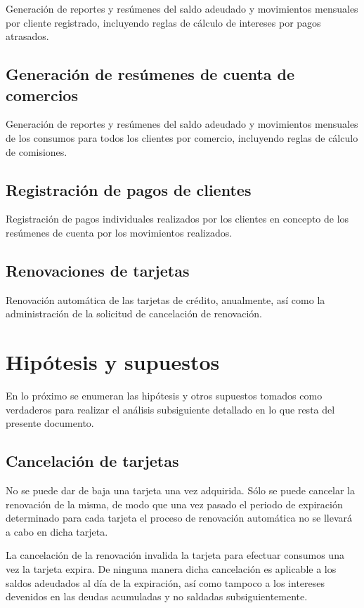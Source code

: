Generación de reportes y resúmenes del saldo adeudado y movimientos mensuales
por cliente registrado, incluyendo reglas de cálculo de intereses por pagos
atrasados.

\subsection{Generación de resúmenes de cuenta de comercios}

Generación de reportes y resúmenes del saldo adeudado y movimientos mensuales de
los consumos para todos los clientes por comercio, incluyendo reglas de cálculo
de comisiones.

\subsection{Registración de pagos de clientes}

Registración de pagos individuales realizados por los clientes en concepto de
los resúmenes de cuenta por los movimientos realizados.

\subsection{Renovaciones de tarjetas}

Renovación automática de las tarjetas de crédito, anualmente, así como la
administración de la solicitud de cancelación de renovación.


\section{Hipótesis y supuestos}

En lo próximo se enumeran las hipótesis y otros supuestos tomados como
verdaderos para realizar el análisis subsiguiente detallado en lo que resta del
presente documento.

\subsection{Cancelación de tarjetas}

No se puede dar de baja una tarjeta una vez adquirida. Sólo se puede cancelar la
renovación de la misma, de modo que una vez pasado el periodo de expiración
determinado para cada tarjeta el proceso de renovación automática no se llevará
a cabo en dicha tarjeta.

La cancelación de la renovación invalida la tarjeta para efectuar consumos una
vez la tarjeta expira. De ninguna manera dicha cancelación es aplicable a los
saldos adeudados al día de la expiración, así como tampoco a los intereses
devenidos en las deudas acumuladas y no saldadas subsiguientemente.

